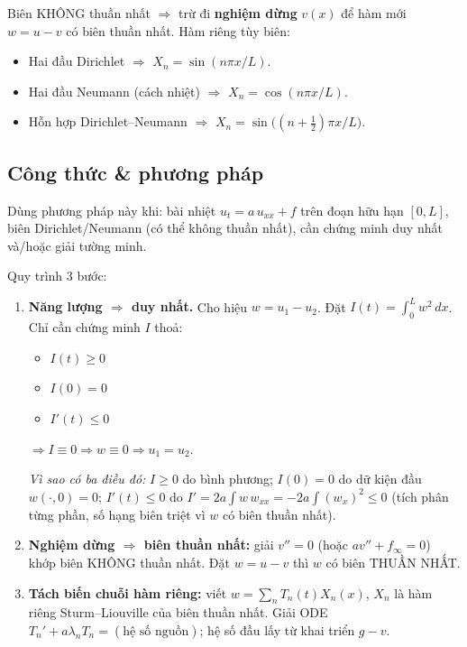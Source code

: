 \begin{meobox}
Biên KHÔNG thuần nhất $\Rightarrow$ trừ đi \textbf{nghiệm dừng} $v(x)$ để hàm mới $w=u-v$ có biên thuần nhất. Hàm riêng tùy biên:
\begin{itemize}
\item Hai đầu Dirichlet $\Rightarrow$ $X_n = \sin(n\pi x/L)$.
\item Hai đầu Neumann (cách nhiệt) $\Rightarrow$ $X_n = \cos(n\pi x/L)$.
\item Hỗn hợp Dirichlet--Neumann $\Rightarrow$ $X_n = \sin\!\big((n+\tfrac12)\pi x/L\big)$.
\end{itemize}
\end{meobox}

\subsection*{Công thức \& phương pháp}

\begin{dieukienbox}
Dùng phương pháp này khi: bài nhiệt $u_t = a\,u_{xx} + f$ trên đoạn hữu hạn $[0,L]$, biên Dirichlet/Neumann (có thể không thuần nhất), cần chứng minh duy nhất và/hoặc giải tường minh.
\end{dieukienbox}

\begin{nhobox}
Quy trình 3 bước:
\begin{enumerate}
\item \textbf{Năng lượng $\Rightarrow$ duy nhất.} Cho hiệu $w=u_1-u_2$. Đặt $I(t)=\int_0^L w^2\,dx$. Chỉ cần chứng minh $I$ thoả:
\begin{itemize}
  \item $I(t)\ge 0$
  \item $I(0)=0$
  \item $I'(t)\le 0$
\end{itemize}
$\Rightarrow I\equiv 0 \Rightarrow w\equiv 0 \Rightarrow u_1=u_2$.

\emph{Vì sao có ba điều đó:} $I\ge0$ do bình phương; $I(0)=0$ do dữ kiện đầu $w(\cdot,0)=0$; $I'(t)\le 0$ do $I'=2a\int w\,w_{xx}=-2a\int(w_x)^2\le 0$ (tích phân từng phần, số hạng biên triệt vì $w$ có biên thuần nhất).
\item \textbf{Nghiệm dừng $\Rightarrow$ biên thuần nhất:} giải $v''=0$ (hoặc $a v''+f_\infty=0$) khớp biên KHÔNG thuần nhất. Đặt $w=u-v$ thì $w$ có biên THUẦN NHẤT.
\item \textbf{Tách biến chuỗi hàm riêng:} viết $w=\sum_n T_n(t)X_n(x)$, $X_n$ là hàm riêng Sturm--Liouville của biên thuần nhất. Giải ODE $T_n'+a\lambda_n T_n = (\text{hệ số nguồn})$; hệ số đầu lấy từ khai triển $g-v$.
\end{enumerate}
\end{nhobox}


